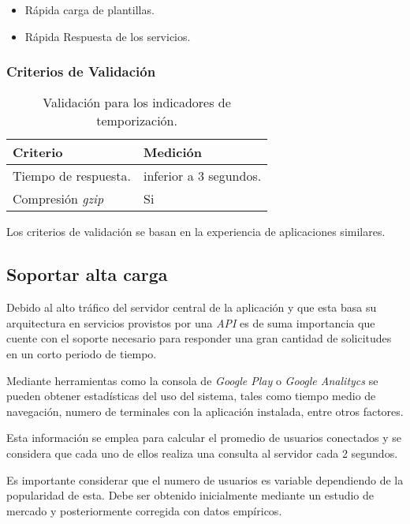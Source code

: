 \begin{itemize}
	\item
	Rápida carga de plantillas.
	\item
	Rápida Respuesta de los servicios.
\end{itemize}

\subsubsection{Criterios de Validación}

\begin{table}[H]
    \caption[Validación para los indicadores de temporización.] {Validación para los indicadores de temporización.}
    \label{tbl:Criterios de Validación temporización}
    \begin{tabular}{|p{}|p{}|}
        \hline
        \textbf{Criterio} &  \textbf{Medición}\\
    	\hline
    	\hline
    	Tiempo de respuesta.  & inferior a 3 segundos. \\ \hline
		Compresión \emph{gzip}   & Si \\ 
        \hline
    \end{tabular}
\end{table}
Los criterios de validación se basan en la experiencia de aplicaciones similares.

\subsection{Soportar alta carga}

Debido al alto tráfico del servidor central de la aplicación y que esta basa su arquitectura en servicios provistos por una \emph{API} es de suma importancia que cuente con el soporte necesario para responder una gran cantidad de solicitudes en un corto periodo de tiempo.

Mediante herramientas como la consola de \emph{Google Play} o \emph{ Google Analitycs} se pueden obtener estadísticas del uso del sistema, tales como tiempo medio de navegación, numero de terminales con la aplicación instalada, entre otros factores.

Esta información se emplea para calcular el promedio de usuarios conectados y se considera que cada uno de ellos realiza una consulta al servidor cada 2 segundos.

Es importante considerar que el numero de usuarios es variable dependiendo de la popularidad de esta. Debe ser obtenido inicialmente mediante un estudio de mercado y posteriormente corregida con datos empíricos.


